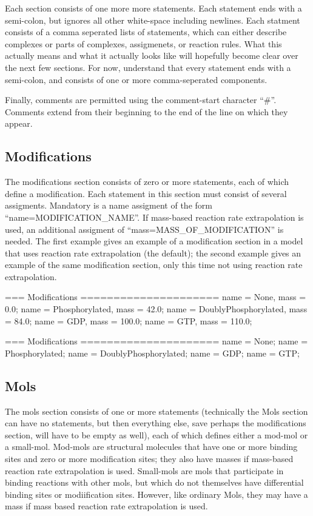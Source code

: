 Each section consists of one more more statements.  Each statement
ends with a semi-colon, but ignores all other white-space including
newlines.  Each statment consists of a comma seperated lists of
statements, which can either describe complexes or parts of complexes,
assigmenets, or reaction rules.  What this actually means and what it
actually looks like will hopefully become clear over the next few
sections.  For now, understand that every statement ends with a
semi-colon, and consists of one or more comma-seperated components.  

Finally, comments are permitted using the comment-start character
``#''.  Comments extend from their beginning to the end of the line on
which they appear.

\subsection{Modifications}
The modifications section consists of zero or more statements, each of
which define a modification.  Each statement in this section must
consist of several assigments.  Mandatory is a name assigment of the
form ``name=MODIFICATION_NAME''.  If mass-based reaction rate
extrapolation is used, an additional assigment of
``mass=MASS_OF_MODIFICATION'' is needed.  The first example gives an
example of a modification section in a model that uses reaction rate
extrapolation (the default); the second example gives an example of
the same modification section, only this time not using reaction rate
extrapolation.

\begin{ExampleXML}
=== Modifications =====================
     name = None, mass = 0.0;
     name = Phosphorylated, mass = 42.0;
     name = DoublyPhosphorylated, mass = 84.0;
     name = GDP, mass = 100.0;
     name = GTP, mass = 110.0;
\end{ExampleXML}

\begin{ExampleXML}
=== Modifications =====================
     name = None;
     name = Phosphorylated;
     name = DoublyPhosphorylated;
     name = GDP;
     name = GTP;
\end{ExampleXML}

\subsection{Mols}

The mols section consists of one or more statements (technically the
Mols section can have no statements, but then everything else, save
perhaps the modifications section, will have to be empty as well),
each of which defines either a mod-mol or a small-mol.  Mod-mols are
structural molecules that have one or more binding sites and zero or
more modification sites; they also have masses if mass-based reaction
rate extrapolation is used.  Small-mols are mols that participate in
binding reactions with other mols, but which do not themselves have
differential binding sites or modiification sites. However, like
ordinary Mols, they may have a mass if mass based reaction rate
extrapolation is used.  


